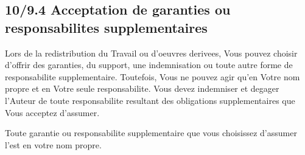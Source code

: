 \documentclass[a4paper,11pt]{article}
\begin{document}
\subsection*{10/9.4 Acceptation de garanties ou responsabilites supplementaires}

Lors de la redistribution du Travail ou d'oeuvres derivees, Vous pouvez
choisir d'offrir des garanties, du support, une indemnisation ou toute
autre forme de responsabilite supplementaire. Toutefois, Vous ne pouvez
agir qu'en Votre nom propre et en Votre seule responsabilite. Vous devez
indemniser et degager l'Auteur de toute responsabilite resultant des
obligations supplementaires que Vous acceptez d'assumer.

Toute garantie ou responsabilite supplementaire que vous choisissez
d'assumer l'est en votre nom propre.
\end{document}

